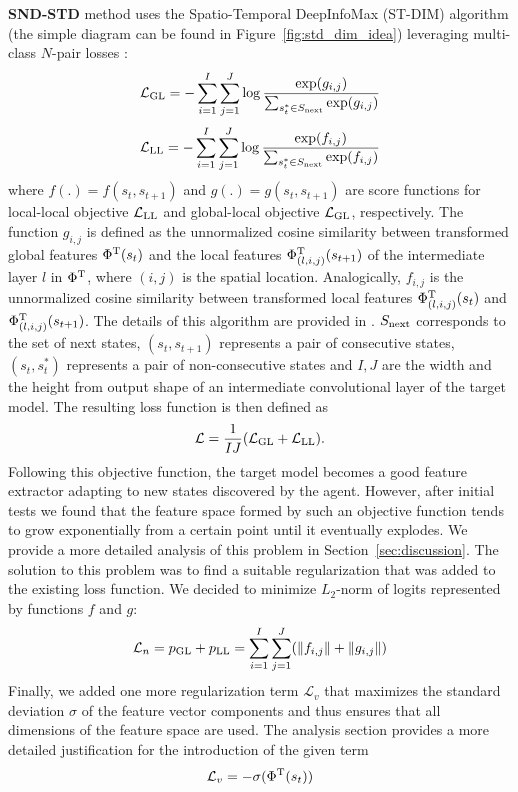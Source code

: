 \documentclass[a4paper,11pt]{elsarticle}
\begin{document}
\textbf{SND-STD} method uses the Spatio-Temporal DeepInfoMax (ST-DIM) algorithm \citep{Anand2019} (the simple diagram can be found in Figure~\ref{fig:std_dim_idea}) leveraging multi-class $N$-pair losses \citep{Sohn2016}: 
\begin{equation}
\label{eq:sndstd1}
\mathcal{L}_{\rm GL} = - \sum_{i=1}^{I} \sum_{j=1}^{J} \log \frac{ \exp (g_{i,j})} { \sum_{s_{t}^{*} \in S_{\rm next}} \exp (g_{i,j})}
\end{equation}
\begin{equation}
\label{eq:sndstd2}
\mathcal{L}_{\rm LL} = -  \sum_{i=1}^{I} \sum_{j=1}^{J} \log \frac{ \exp (f_{i,j})} { \sum_{s_{t}^{*} \in S_{\rm next}} \exp (f_{i,j})}
\end{equation}
where $f(.) = f(s_t, s_{t+1})$ and $g(.) = g(s_t, s_{t+1})$
are score functions for local-local objective $\mathcal{L}_{\rm LL}$ and global-local objective $\mathcal{L}_{\rm GL}$, respectively. 
The function $g_{i,j}$ is defined as the unnormalized cosine similarity between transformed global features $\Phi^{\rm T}(s_t)$ and the local features $\Phi^{\rm T}_{(l,i,j)}(s_{t+1})$ of the intermediate layer $l$ in $\Phi^{\rm T}$, where $(i,j)$ is the spatial location. Analogically, $f_{i,j}$ is the unnormalized cosine similarity between transformed local features $\Phi^{\rm T}_{(l,i,j)}(s_t)$ and $\Phi^{\rm T}_{(l,i,j)}(s_{t+1})$. The details of this algorithm are provided in \cite{Anand2019}. $S_{\rm next}$ corresponds to the set of next states, $(s_t, s_{t+1})$ represents a pair of consecutive states, $(s_t, s_{t}^{*})$ represents a pair of non-consecutive states and $I,J$ are the width and the height from output shape of an intermediate convolutional layer of the target model.
The resulting loss function is then defined as
\begin{equation}
\label{eq:sndstd3}
\mathcal{L} = \frac{1}{IJ} (\mathcal{L}_{\rm GL} + \mathcal{L}_{\rm LL}).
\end{equation}
Following this objective function, the target model becomes a good feature extractor adapting to new states discovered by the agent. However, after initial tests we found that the feature space formed by such an objective function tends to grow exponentially from a certain point until it eventually explodes. We provide a more detailed analysis of this problem in Section~\ref{sec:discussion}. The solution to this problem was to find a suitable regularization that was added to the existing loss function. We decided to minimize $L_2$-norm of logits represented by functions $f$ and $g$:
\begin{equation}
\label{eq:sndstd4}
\mathcal{L}_{n} = p_{\rm GL} + p_{\rm LL} = 
\sum_{i=1}^{I} \sum_{j=1}^J (\| f_{i,j} \| + \| g_{i,j} \|)
\end{equation}
Finally, we added one more regularization term $\mathcal{L}_v$ that maximizes the standard deviation $\sigma$ of the feature vector components and thus ensures that all dimensions of the feature space are used. The analysis section provides a more detailed justification for the introduction of the given term
\begin{equation}
\label{eq:sndstd5}
\mathcal{L}_{v} = -\sigma(\Phi^{\rm T}(s_t))
\end{equation}
\end{document}
